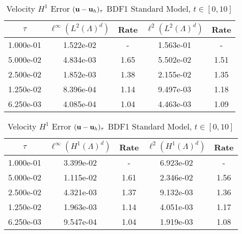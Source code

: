 \documentclass[letterpaper]{erdc}
\begin{document}
\begin{table}[h!]
  \parbox{.45\linewidth}{
  \tiny
  \centering
    \caption{Velocity $L^2$ Error $(\textbf{u} - \textbf{u}_h)_{\tau}$ BDF1 Standard Model, $t\in[0,10]$}
    \begin{tabular}{c|c|c|c|c}
      $\tau$ &  $\ell^{\infty}\left(L^2(\Lambda)^d\right)$ &  Rate  &  $\ell^2\left(L^2(\Lambda)^d\right)$  &  Rate\\
      \hline
      1.000e-01 & 1.522e-02 &  -   & 1.563e-01 &  -  \\
      5.000e-02 & 4.834e-03 & 1.65 & 5.502e-02 & 1.51\\
      2.500e-02 & 1.852e-03 & 1.38 & 2.155e-02 & 1.35\\
      1.250e-02 & 8.396e-04 & 1.14 & 9.497e-03 & 1.18\\
      6.250e-03 & 4.085e-04 & 1.04 & 4.463e-03 & 1.09
    \end{tabular}
    }
    \hfill
    \parbox{.45\linewidth}{
    \tiny
    \centering
      \caption{Velocity $H^1$ Error $(\textbf{u} - \textbf{u}_h)_{\tau}$ BDF1 Standard Model, $t\in[0,10]$}
      \begin{tabular}{c|c|c|c|c}
        $\tau$ &  $\ell^{\infty}\left(H^1(\Lambda)^d\right)$ &  Rate  &  $\ell^2\left(H^1(\Lambda)^d\right)$  &  Rate\\
        \hline
        1.000e-01 & 3.399e-02 &  -   & 6.923e-02 &  -  \\
        5.000e-02 & 1.115e-02 & 1.61 & 2.346e-02 & 1.56\\
        2.500e-02 & 4.321e-03 & 1.37 & 9.132e-03 & 1.36\\
        1.250e-02 & 1.963e-03 & 1.14 & 4.051e-03 & 1.17\\
        6.250e-03 & 9.547e-04 & 1.04 & 1.919e-03 & 1.08
      \end{tabular}
    }
\end{table}



%
%
\end{document}

